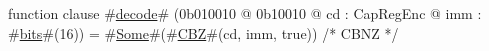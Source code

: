 function clause #\hyperref[zdecode]{decode}# (0b010010 @ 0b10010 @ cd : CapRegEnc @ imm : #\hyperref[zbits]{bits}#(16)) = #\hyperref[zSome]{Some}#(#\hyperref[zCBZ]{CBZ}#(cd, imm, true))  /* CBNZ */
